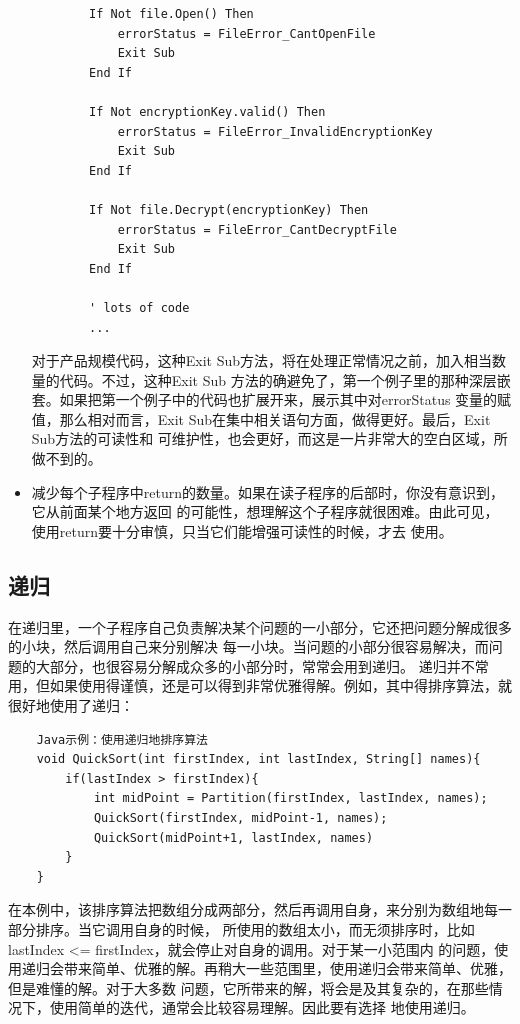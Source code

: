 \documentclass{article}
\begin{document}
\begin{itemize}
\begin{lstlisting}
        If Not file.Open() Then
            errorStatus = FileError_CantOpenFile
            Exit Sub
        End If

        If Not encryptionKey.valid() Then
            errorStatus = FileError_InvalidEncryptionKey
            Exit Sub
        End If

        If Not file.Decrypt(encryptionKey) Then
            errorStatus = FileError_CantDecryptFile
            Exit Sub
        End If

        ' lots of code
        ...
    \end{lstlisting}
    对于产品规模代码，这种Exit Sub方法，将在处理正常情况之前，加入相当数量的代码。不过，这种Exit Sub
    方法的确避免了，第一个例子里的那种深层嵌套。如果把第一个例子中的代码也扩展开来，展示其中对errorStatus
    变量的赋值，那么相对而言，Exit Sub在集中相关语句方面，做得更好。最后，Exit Sub方法的可读性和
    可维护性，也会更好，而这是一片非常大的空白区域，所做不到的。
    \item 减少每个子程序中return的数量。如果在读子程序的后部时，你没有意识到，它从前面某个地方返回
    的可能性，想理解这个子程序就很困难。由此可见，使用return要十分审慎，只当它们能增强可读性的时候，才去
    使用。
\end{itemize}

\subsection{递归}
在递归里，一个子程序自己负责解决某个问题的一小部分，它还把问题分解成很多的小块，然后调用自己来分别解决
每一小块。当问题的小部分很容易解决，而问题的大部分，也很容易分解成众多的小部分时，常常会用到递归。
递归并不常用，但如果使用得谨慎，还是可以得到非常优雅得解。例如，其中得排序算法，就很好地使用了递归：
\begin{lstlisting}
    Java示例：使用递归地排序算法
    void QuickSort(int firstIndex, int lastIndex, String[] names){
        if(lastIndex > firstIndex){
            int midPoint = Partition(firstIndex, lastIndex, names);
            QuickSort(firstIndex, midPoint-1, names);
            QuickSort(midPoint+1, lastIndex, names)
        }
    }
\end{lstlisting}
在本例中，该排序算法把数组分成两部分，然后再调用自身，来分别为数组地每一部分排序。当它调用自身的时候，
所使用的数组太小，而无须排序时，比如lastIndex <= firstIndex，就会停止对自身的调用。对于某一小范围内
的问题，使用递归会带来简单、优雅的解。再稍大一些范围里，使用递归会带来简单、优雅，但是难懂的解。对于大多数
问题，它所带来的解，将会是及其复杂的，在那些情况下，使用简单的迭代，通常会比较容易理解。因此要有选择
地使用递归。
\end{document}
